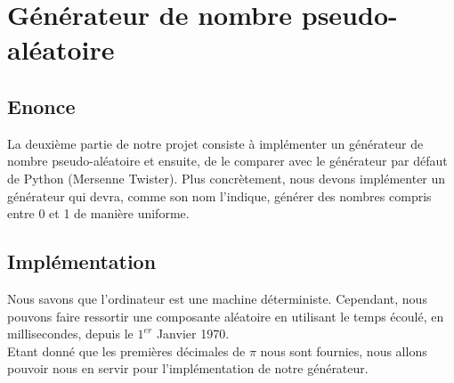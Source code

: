 \documentclass[french]{article}
\begin{document}
\section{Générateur de nombre pseudo-aléatoire}
\subsection{Enonce}
La deuxième partie de notre projet consiste à implémenter un générateur de nombre pseudo-aléatoire et ensuite, de le comparer avec le générateur par défaut de Python (Mersenne Twister). Plus concrètement, nous devons implémenter un générateur qui devra, comme son nom l'indique, générer des nombres compris entre 0 et 1
de manière uniforme.

\subsection{Implémentation}
Nous savons que l'ordinateur est une machine déterministe. Cependant, nous pouvons faire ressortir une composante aléatoire en utilisant le temps écoulé, en millisecondes, depuis le $1^{er}$ Janvier 1970.
\\
Etant donné que les premières décimales de  $\pi$ nous sont fournies, nous allons pouvoir nous en servir pour l'implémentation de notre générateur.
\end{document}
